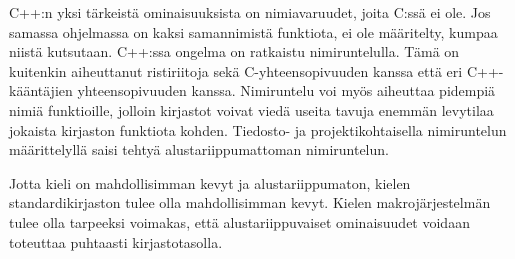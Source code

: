 
C++:n yksi tärkeistä ominaisuuksista on nimiavaruudet, joita C:ssä ei ole. Jos
samassa ohjelmassa on kaksi samannimistä funktiota, ei ole määritelty, kumpaa
niistä kutsutaan. C++:ssa ongelma on ratkaistu nimiruntelulla. Tämä on
kuitenkin aiheuttanut ristiriitoja sekä C-yhteensopivuuden kanssa että eri
C++-kääntäjien yhteensopivuuden kanssa. Nimiruntelu voi myös aiheuttaa pidempiä
nimiä funktioille, jolloin kirjastot voivat viedä useita tavuja enemmän
levytilaa jokaista kirjaston funktiota kohden. Tiedosto- ja projektikohtaisella
nimiruntelun määrittelyllä saisi tehtyä alustariippumattoman nimiruntelun.

Jotta kieli on mahdollisimman kevyt ja alustariippumaton, kielen
standardikirjaston tulee olla mahdollisimman kevyt. Kielen makrojärjestelmän
tulee olla tarpeeksi voimakas, että alustariippuvaiset ominaisuudet voidaan
toteuttaa puhtaasti kirjastotasolla.

%
%
%

